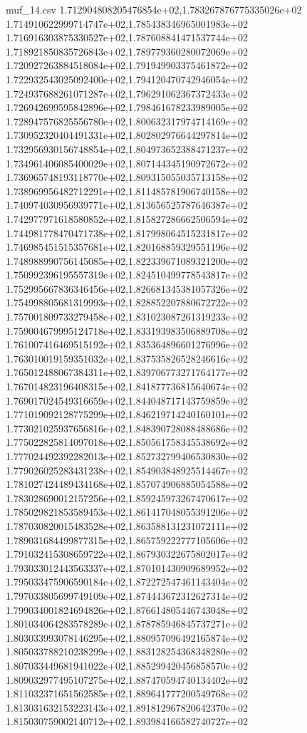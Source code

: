 \begin{filecontents*}{muf_14.csv}
1.712904808205476854e+02,1.783267876775335026e+02
1.714910622999714747e+02,1.785438346965001983e+02
1.716916303875330527e+02,1.787608841471537744e+02
1.718921850835726843e+02,1.789779360280072069e+02
1.720927263884518084e+02,1.791949903375461872e+02
1.722932543025092400e+02,1.794120470742946054e+02
1.724937688261071287e+02,1.796291062367372433e+02
1.726942699595842896e+02,1.798461678233989005e+02
1.728947576825556780e+02,1.800632317974714169e+02
1.730952320404491331e+02,1.802802976644297814e+02
1.732956930156748854e+02,1.804973652388471237e+02
1.734961406085400029e+02,1.807144345190972672e+02
1.736965748193118770e+02,1.809315055035713158e+02
1.738969956482712291e+02,1.811485781906740158e+02
1.740974030956939771e+02,1.813656525787646387e+02
1.742977971618580852e+02,1.815827286662506594e+02
1.744981778470471738e+02,1.817998064515231817e+02
1.746985451515357681e+02,1.820168859329551196e+02
1.748988990756145085e+02,1.822339671089321200e+02
1.750992396195557319e+02,1.824510499778543817e+02
1.752995667836346456e+02,1.826681345381057326e+02
1.754998805681319993e+02,1.828852207880672722e+02
1.757001809733279458e+02,1.831023087261319233e+02
1.759004679995124718e+02,1.833193983506889708e+02
1.761007416469515192e+02,1.835364896601276996e+02
1.763010019159351032e+02,1.837535826528246616e+02
1.765012488067384311e+02,1.839706773271764177e+02
1.767014823196408315e+02,1.841877736815640674e+02
1.769017024549316659e+02,1.844048717143759859e+02
1.771019092128775299e+02,1.846219714240160101e+02
1.773021025937656816e+02,1.848390728088488686e+02
1.775022825814097018e+02,1.850561758345538692e+02
1.777024492392282013e+02,1.852732799406530830e+02
1.779026025283431238e+02,1.854903848925514467e+02
1.781027424489434168e+02,1.857074906885054588e+02
1.783028690012157256e+02,1.859245973267470617e+02
1.785029821853589453e+02,1.861417048055391206e+02
1.787030820015483528e+02,1.863588131231072111e+02
1.789031684499877315e+02,1.865759222777105606e+02
1.791032415308659722e+02,1.867930322675802017e+02
1.793033012443563337e+02,1.870101430909689952e+02
1.795033475906590184e+02,1.872272547461143404e+02
1.797033805699749109e+02,1.874443672312627314e+02
1.799034001824694826e+02,1.876614805446743048e+02
1.801034064283578289e+02,1.878785946845737271e+02
1.803033993078146295e+02,1.880957096492165874e+02
1.805033788210238299e+02,1.883128254368348280e+02
1.807033449681941022e+02,1.885299420456858570e+02
1.809032977495107275e+02,1.887470594740134402e+02
1.811032371651562585e+02,1.889641777200549768e+02
1.813031632153223143e+02,1.891812967820642370e+02
1.815030759002140712e+02,1.893984166582740727e+02

\end{filecontents*}
